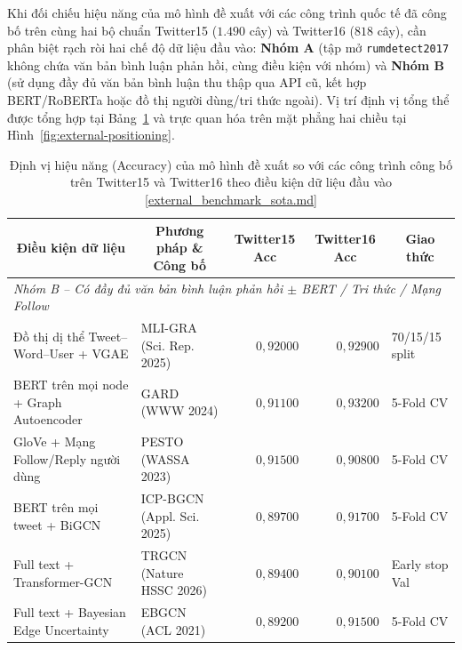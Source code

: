 \documentclass[11pt,a4paper]{extreport}
\newcommand{\ghrepo}{https://github.com/pqui-345/BiGCN-Plus-Rumor-Detection/blob/main}
\newcommand{\coderef}[2]{\textnormal{[\href{\ghrepo/#1}{#2}]}}
\begin{document}
Khi đối chiếu hiệu năng của mô hình đề xuất với các công trình quốc tế đã công bố trên cùng hai bộ chuẩn Twitter15 ($1.490$ cây) và Twitter16 ($818$ cây), cần phân biệt rạch ròi hai chế độ dữ liệu đầu vào: \textbf{Nhóm A} (tập mở \texttt{rumdetect2017} không chứa văn bản bình luận phản hồi, cùng điều kiện với nhóm) và \textbf{Nhóm B} (sử dụng đầy đủ văn bản bình luận thu thập qua API cũ, kết hợp BERT/RoBERTa hoặc đồ thị người dùng/tri thức ngoài). Vị trí định vị tổng thể được tổng hợp tại Bảng~\ref{tab:external-sota} và trực quan hóa trên mặt phẳng hai chiều tại Hình~\ref{fig:external-positioning}.

\begin{table}[htbp]
    \centering
    \caption[Định vị hiệu năng với các công trình công bố trên Twitter15 và Twitter16]{Định vị hiệu năng (Accuracy) của mô hình đề xuất so với các công trình công bố trên Twitter15 và Twitter16 theo điều kiện dữ liệu đầu vào \coderef{results/tables/external_benchmark_sota.md}{external\_benchmark\_sota.md}}
    \label{tab:external-sota}
    \scriptsize
    \setlength{\tabcolsep}{4pt}
    \begin{tabular}{@{}llrrl@{}}
        \toprule
        \multicolumn{1}{c}{\textbf{Điều kiện dữ liệu}} & \multicolumn{1}{c}{\textbf{Phương pháp \& Công bố}} & \multicolumn{1}{c}{\textbf{Twitter15 Acc}} & \multicolumn{1}{c}{\textbf{Twitter16 Acc}} & \multicolumn{1}{c}{\textbf{Giao thức}} \\
        \midrule
        \multicolumn{5}{l}{\textit{Nhóm B -- Có đầy đủ văn bản bình luận phản hồi $\pm$ BERT / Tri thức / Mạng Follow}} \\
        Đồ thị dị thể Tweet--Word--User + VGAE & MLI-GRA (Sci. Rep. 2025) & $0{,}92000$ & $0{,}92900$ & 70/15/15 split \\
        BERT trên mọi node + Graph Autoencoder & GARD (WWW 2024) \cite{tao_semantic_2024} & $0{,}91100$ & $0{,}93200$ & 5-Fold CV \\
        GloVe + Mạng Follow/Reply người dùng & PESTO (WASSA 2023) \cite{noauthor_pesto_2023} & $0{,}91500$ & $0{,}90800$ & 5-Fold CV \\
        BERT trên mọi tweet + BiGCN & ICP-BGCN (Appl. Sci. 2025) \cite{noauthor_integrating_2025} & $0{,}89700$ & $0{,}91700$ & 5-Fold CV \\
        Full text + Transformer-GCN & TRGCN (Nature HSSC 2026) \cite{yan_trgcn_2026} & $0{,}89400$ & $0{,}90100$ & Early stop Val \\
        Full text + Bayesian Edge Uncertainty & EBGCN (ACL 2021) \cite{wei_towards_2021} & $0{,}89200$ & $0{,}91500$ & 5-Fold CV \\

\end{tabular}
\end{table}
\end{document}
